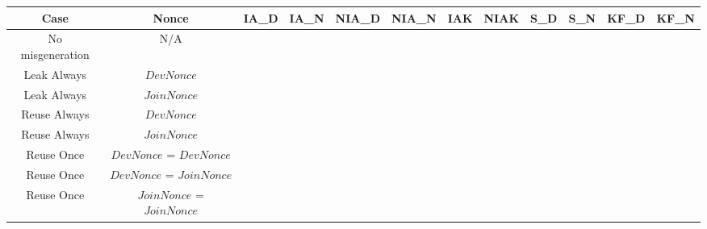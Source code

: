 \documentclass[crop]{standalone}
\newcommand{\noattack}{\color{ForestGreen}\usym{2713}\color{black}}
\newcommand{\attack}{\color{red}\usym{2717}\color{black}}
\begin{document}
\parbox{30cm}{
\begin{tabular}{|c|c|c|c|c|c|c|c|c|c|c|c|}
\hline
Case & Nonce & IA\_D & IA\_N & NIA\_D & NIA\_N & IAK & NIAK & S\_D & S\_N & KF\_D & KF\_N \\ \hline
No misgeneration & N/A & \attack & \attack & \attack & \noattack & \attack & \attack & \noattack & \noattack & \noattack & \noattack\\ \hline
Leak Always & $DevNonce$ & \attack & \attack & \attack & \noattack & \attack & \attack & \noattack & \noattack & \noattack & \noattack\\ \hline
Leak Always & $JoinNonce$ & \attack & \attack & \attack & \noattack & \attack & \attack & \noattack & \noattack & \noattack & \noattack\\ \hline
Reuse Always & $DevNonce$ & \attack & \attack & \noattack & \noattack & \attack & \noattack & \noattack & \noattack & \attack & \noattack\\ \hline
Reuse Always & $JoinNonce$ & \attack & \attack & \attack & \noattack & \attack & \attack & \noattack & \noattack & \noattack & \attack\\ \hline
Reuse Once & $DevNonce$ = $DevNonce$ & \attack & \attack & \attack & \noattack & \attack & \attack & \noattack & \noattack & \attack & \noattack\\ \hline
Reuse Once & $DevNonce$ = $JoinNonce$ & \attack & \attack & \attack & \noattack & \attack & \attack & \noattack & \noattack & \noattack & \noattack\\ \hline
Reuse Once & $JoinNonce$ = $JoinNonce$ & \attack & \attack & \attack & \noattack & \attack & \attack & \noattack & \noattack & \noattack & \attack\\ \hline
\end{tabular}}
\end{document}
